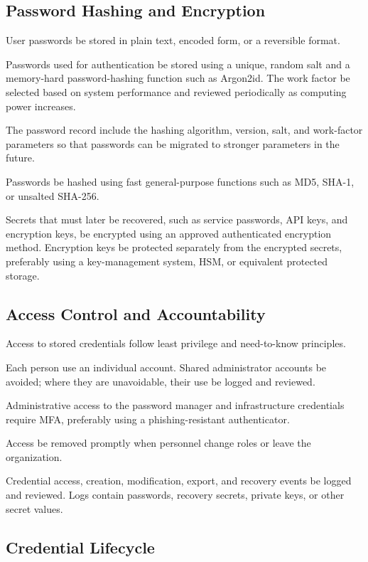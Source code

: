 \subsection{Password Hashing and Encryption}

User passwords \mustnot{} be stored in plain text, encoded form, or a reversible format.

Passwords used for authentication \should{} be stored using a unique, random salt and a memory-hard password-hashing function such as Argon2id. The work factor \should{} be selected based on system performance and reviewed periodically as computing power increases.

The password record \should{} include the hashing algorithm, version, salt, and work-factor parameters so that passwords can be migrated to stronger parameters in the future.

Passwords \mustnot{} be hashed using fast general-purpose functions such as MD5, SHA-1, or unsalted SHA-256.

Secrets that must later be recovered, such as service passwords, API keys, and encryption keys, \must{} be encrypted using an approved authenticated
encryption method. Encryption keys \must{} be protected separately from the encrypted secrets, preferably using a key-management system, HSM, or equivalent protected storage.

\subsection{Access Control and Accountability}

Access to stored credentials \must{} follow least privilege and need-to-know principles.

Each person \should{} use an individual account. Shared administrator accounts \should{} be avoided; where they are unavoidable, their use \must{} be logged and reviewed.

Administrative access to the password manager and infrastructure credentials \should{} require MFA, preferably using a phishing-resistant authenticator.

Access \must{} be removed promptly when personnel change roles or leave the organization.

Credential access, creation, modification, export, and recovery events \should{} be logged and reviewed. Logs \mustnot{} contain passwords, recovery
secrets, private keys, or other secret values.

\subsection{Credential Lifecycle}


